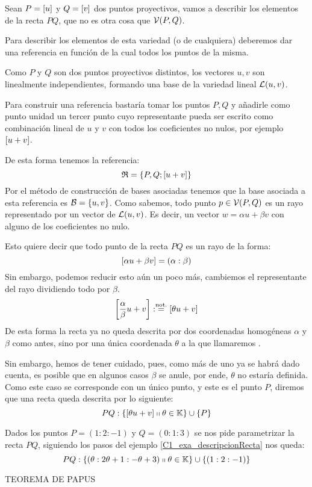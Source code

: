 \begin{exa}
	\label{C1_exa_descripcionRecta}
	Sean $P=\left [ u \right ]$ y $Q=\left [ v \right ]$ dos puntos proyectivos, vamos a describir los elementos de la recta $PQ$, que no es otra cosa que $\mathcal{V}(P,Q)$.
	
	Para describir los elementos de esta variedad (o de cualquiera) deberemos dar una referencia en función de la cual  todos los puntos de la misma.
	
	Como $P$ y $Q$ son dos puntos proyectivos distintos, los vectores $u,v$ son linealmente independientes, formando una base de la variedad lineal $\mathcal{L}(u,v)$.
	
	Para construir una referencia bastaría tomar los puntos $P,Q$ y añadirle como punto unidad un tercer punto cuyo representante pueda ser escrito como combinación lineal de $u$ y $v$ con todos los coeficientes no nulos, por ejemplo $\left [ u+v \right ]$.
	
	De esta forma tenemos la referencia:
	\[\mathfrak{R}=\{P,Q;\left [ u+v \right ]\}\]
	Por el método de construcción de bases asociadas tenemos que la base asociada a esta referencia es $\mathcal{B}=\{u,v\}$. Como sabemos, todo punto $p\in\mathcal{V}(P,Q)$ es un rayo representado por un vector de $\mathcal{L}(u,v)$. Es decir, un vector $w=\alpha u+\beta v$ con alguno de los coeficientes no nulo.
	
	Esto quiere decir que todo punto de la recta $PQ$ es un rayo de la forma: \[\left [ \alpha u+\beta v \right ]=(\alpha:\beta)\]
	Sin embargo, podemos reducir esto aún un poco más, cambiemos el representante del rayo dividiendo todo por $\beta$.
	\[\left [ \frac{\alpha}{\beta}u+v \right ]:\stackrel{\textrm{not.}}{=}\left [ \theta u+v \right ]\]
	De esta forma la recta ya no queda descrita por dos coordenadas homogéneas $\alpha$ y $\beta$ como antes, sino por una única coordenada $\theta$ a la que llamaremos .
	
	Sin embargo, hemos de tener cuidado, pues, como más de uno ya se habrá dado cuenta, es posible que en algunos casos $\beta$ se anule, por ende, $\theta$ no estaría definida. Como este caso se corresponde con un único punto, y este es el punto $P$, diremos que una recta queda descrita por lo siguiente:
	\begin{equation}
	\label{C1_eq_descripcionRecta}
	PQ:\{\left [ \theta u+v \right ]\shortparallel \theta\in\mathbb{K}\}\cup\{P\}
	\end{equation}
\end{exa}
\begin{exa}
	\label{C1_exa_rectaConcreta}
	Dados los puntos $P=(1:2:-1)$ y $Q=(0:1:3)$ se nos pide parametrizar la recta $PQ$, siguiendo los pasos del ejemplo \ref{C1_exa_descripcionRecta} nos queda:
	\[
	PQ:\{(\theta:2\theta+1:-\theta+3)\shortparallel\theta\in\mathbb{K}\}\cup\{(1:2:-1)\}
	\]
\end{exa}

TEOREMA DE PAPUS